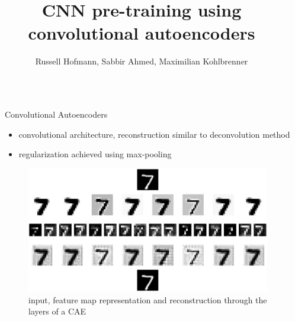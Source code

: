 \documentclass[final]{beamer}
\title{CNN pre-training using convolutional autoencoders} %
\author{Russell Hofmann, Sabbir Ahmed, Maximilian Kohlbrenner } %
\institute{TU Berlin} %
\newlength{\sepwid}
\newlength{\onecolwid}
\begin{document}

\setlength{\belowcaptionskip}{2ex} %
\setlength\belowdisplayshortskip{2ex} %

\begin{frame}[t] %

\begin{columns}[t] %

\begin{column}{\sepwid}\end{column} %

\begin{column}{\onecolwid} %


\begin{block}{Convolutional Autoencoders}

\begin{itemize}
	\item convolutional architecture, reconstruction similar to deconvolution method 
	\item regularization achieved using max-pooling
\end{itemize}

\begin{figure}
\includegraphics[width=0.8\linewidth]{graphics/feature_map_walkthrough_mnist.png}
\caption{input, feature map representation and reconstruction through the layers of a CAE}
\end{figure}


\end{block}
\end{column}
\end{columns}
\end{frame}
\end{document}
